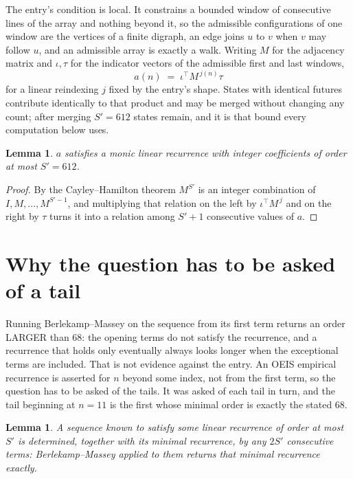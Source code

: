 \documentclass[11pt,a4paper]{article}
\theoremstyle{plain}
\newtheorem{lemma}[theorem]{Lemma}
\theoremstyle{definition}
\begin{document}
The entry's condition is local. It constrains a bounded window of consecutive lines of the
array and nothing beyond it, so the admissible configurations of one window are the vertices of
a finite digraph, an edge joins $u$ to $v$ when $v$ may follow $u$, and an admissible array is
exactly a walk. Writing $M$ for the adjacency matrix and $\iota,\tau$ for the indicator vectors
of the admissible first and last windows,
\[
a(n)\;=\;\iota^{\!\top}M^{\,j(n)}\tau
\]
for a linear reindexing $j$ fixed by the entry's shape. States with identical futures
contribute identically to that product and may be merged without changing any count; after
merging $S'=612$ states remain, and it is that bound every computation below uses.

\begin{lemma}\label{lem:cf}
$a$ satisfies a monic linear recurrence with integer coefficients of order at most $S'=612$.
\end{lemma}

\begin{proof}
By the Cayley--Hamilton theorem $M^{S'}$ is an integer combination of $I,M,\dots,M^{S'-1}$,
and multiplying that relation on the left by $\iota^{\!\top}M^{\,j}$ and on the right by
$\tau$ turns it into a relation among $S'+1$ consecutive values of $a$.
\end{proof}

\section{Why the question has to be asked of a tail}

Running Berlekamp--Massey on the sequence from its first term returns an order LARGER than $68$: the opening terms do not satisfy the recurrence, and a recurrence that holds only eventually always looks longer when the exceptional terms are included. That is not evidence against the entry. An OEIS empirical recurrence is asserted for $n$ beyond some index, not from the first term, so the question has to be asked of the tails. It was asked of each tail in turn, and the tail beginning at $n=11$ is the first whose minimal order is exactly the stated $68$.

\begin{lemma}\label{lem:bm}
A sequence known to satisfy some linear recurrence of order at most $S'$ is determined,
together with its minimal recurrence, by any $2S'$ consecutive terms: Berlekamp--Massey applied
to them returns that minimal recurrence exactly.
\end{lemma}
\end{document}
